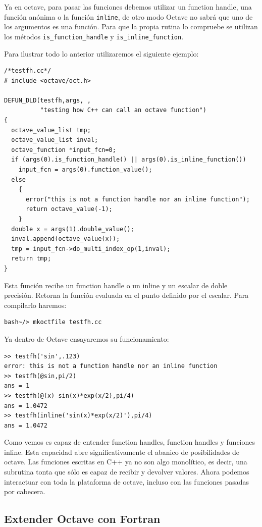 Ya en octave, para pasar las funciones debemos utilizar un function
handle, una función anónima o la función \texttt{inline}, de otro modo
Octave no sabrá que uno de los argumentos es una función.  Para que
la propia rutina lo compruebe se utilizan los métodos 
\texttt{is\_function\_handle} y \texttt{is\_inline\_function}.

Para ilustrar todo lo anterior utilizaremos el siguiente ejemplo:

\begin{verbatim}
/*testfh.cc*/
# include <octave/oct.h>

DEFUN_DLD(testfh,args, ,
          "testing how C++ can call an octave function")
{
  octave_value_list tmp;
  octave_value_list inval;
  octave_function *input_fcn=0;
  if (args(0).is_function_handle() || args(0).is_inline_function())
    input_fcn = args(0).function_value();
  else
    {
      error("this is not a function handle nor an inline function");
      return octave_value(-1);
    }
  double x = args(1).double_value();
  inval.append(octave_value(x));
  tmp = input_fcn->do_multi_index_op(1,inval);
  return tmp;
}
\end{verbatim}

Esta función recibe un function handle o un inline y un escalar de doble
precisión. Retorna la función evaluada en el punto definido por el escalar.
Para compilarlo haremos:

\begin{verbatim}
bash~/> mkoctfile testfh.cc
\end{verbatim}

Ya dentro de Octave ensayaremos su funcionamiento:

\begin{verbatim}
>> testfh('sin',.123)
error: this is not a function handle nor an inline function
>> testfh(@sin,pi/2)
ans = 1
>> testfh(@(x) sin(x)*exp(x/2),pi/4)
ans = 1.0472
>> testfh(inline('sin(x)*exp(x/2)'),pi/4)
ans = 1.0472
\end{verbatim}

Como vemos es capaz de entender function handles, function handles y
funciones inline.  Esta capacidad abre significativamente el abanico
de posibilidades de octave.  Las funciones escritas en C++ ya no son
algo monolítico, es decir, una subrutina tonta que sólo es capaz de
recibir y devolver valores.  Ahora podemos interactuar con toda
la plataforma de octave, incluso con las funciones pasadas por
cabecera.

\subsection{Extender Octave con Fortran}

